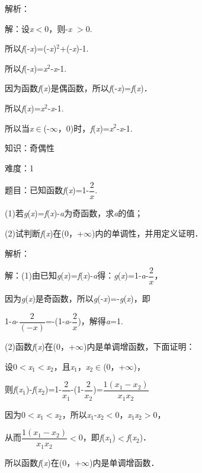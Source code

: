 \documentclass{article} %
\begin{document}
解析：

解：设\textit{x}$\mathrm{<}$0，则-\textit{x} $\mathrm{>}$0.

所以\textit{f}(-\textit{x})=(-\textit{x})${}^{2}$+(-\textit{x})-1.

所以\textit{f}(-\textit{x})=\textit{x}${}^{2}$-\textit{x}-1.

因为函数\textit{f}(\textit{x})是偶函数，所以\textit{f}(-\textit{x})=\textit{f}(\textit{x})．

所以\textit{f}(\textit{x})=\textit{x}${}^{2}$-\textit{x}-1.

所以当\textit{x}$\mathrm{\in}$(-$\mathrm{\infty}$，0)时，\textit{f}(\textit{x})=\textit{x}${}^{2}$-\textit{x}-1.

知识：奇偶性

难度：1

题目：已知函数\textit{f}(\textit{x})=1-$\dfrac{2}{x}$.

(1)若\textit{g}(\textit{x})=\textit{f}(\textit{x})-\textit{a}为奇函数，求\textit{a}的值；

(2)试判断\textit{f}(\textit{x})在(0，+$\mathrm{\infty}$)内的单调性，并用定义证明．

解析：

解：(1)由已知\textit{g}(\textit{x})=\textit{f}(\textit{x})-\textit{a}得：\textit{g}(\textit{x})=1-\textit{a}-$\dfrac{2}{x}$，

因为\textit{g}(\textit{x})是奇函数，所以\textit{g}(-\textit{x})=-\textit{g}(\textit{x})，即

1-\textit{a}-$\dfrac{2}{(-x)}$=-(1-\textit{a}-$\dfrac{2}{x}$)，解得\textit{a}=1.

(2)函数\textit{f}(\textit{x})在(0，+$\mathrm{\infty}$)内是单调增函数，下面证明：

设0$\mathrm{<}$\textit{x}${}_{1}$$\mathrm{<}$\textit{x}${}_{2}$，且\textit{x}${}_{1}$，\textit{x}${}_{2}$$\mathrm{\in}$(0，+$\mathrm{\infty}$)，

则\textit{f}(\textit{x}${}_{1}$)-\textit{f}(\textit{x}${}_{2}$)=1-$\dfrac{2}{x_{1}}$-(1-$\dfrac{2}{x_{2}}$)=$\dfrac{1(x_{1}-x_{2})}{x_{1}x_{2}}$

因为0$\mathrm{<}$\textit{x}${}_{1}$$\mathrm{<}$\textit{x}${}_{2}$，所以\textit{x}${}_{1}$-\textit{x}${}_{2}$$\mathrm{<}$0，\textit{x}${}_{1}$\textit{x}${}_{2}$$\mathrm{>}$0，

从而$\dfrac{1(x_{1}-x_{2})}{x_{1}x_{2}}$$\mathrm{<}$0，即\textit{f}(\textit{x}${}_{1}$)$\mathrm{<}$\textit{f}(\textit{x}${}_{2}$)．

所以函数\textit{f}(\textit{x})在(0，+$\mathrm{\infty}$)内是单调增函数．
\end{document}
